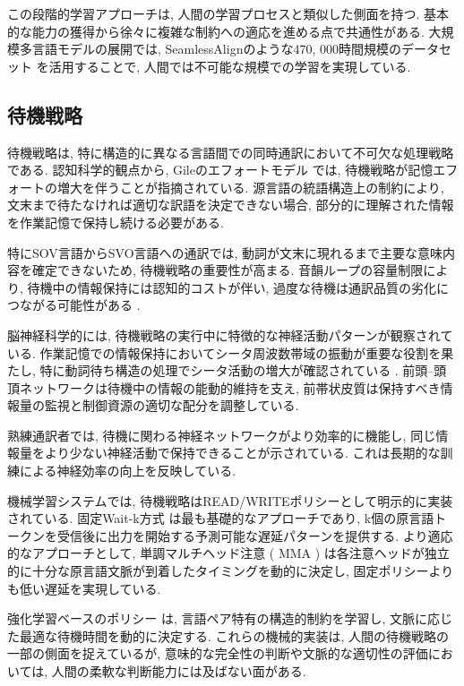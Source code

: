 この段階的学習アプローチは, 人間の学習プロセスと類似した側面を持つ.
基本的な能力の獲得から徐々に複雑な制約への適応を進める点で共通性がある.
大規模多言語モデルの展開では, SeamlessAlignのような470, 000時間規模のデータセット \cite{barrault2023seamlessm4t} を活用することで, 人間では不可能な規模での学習を実現している.

\subsection{待機戦略}

待機戦略は, 特に構造的に異なる言語間での同時通訳において不可欠な処理戦略である.
認知科学的観点から, Gileのエフォートモデル \cite{gile1995basic} では, 待機戦略が記憶エフォートの増大を伴うことが指摘されている.
源言語の統語構造上の制約により, 文末まで待たなければ適切な訳語を決定できない場合, 部分的に理解された情報を作業記憶で保持し続ける必要がある.

特にSOV言語からSVO言語への通訳では, 動詞が文末に現れるまで主要な意味内容を確定できないため, 待機戦略の重要性が高まる.
音韻ループの容量制限により, 待機中の情報保持には認知的コストが伴い, 過度な待機は通訳品質の劣化につながる可能性がある \cite{baddeley2000episodic}.

脳神経科学的には, 待機戦略の実行中に特徴的な神経活動パターンが観察されている.
作業記憶での情報保持においてシータ周波数帯域の振動が重要な役割を果たし, 特に動詞待ち構造の処理でシータ活動の増大が確認されている \cite{elmer2016functional}.
前頭--頭頂ネットワークは待機中の情報の能動的維持を支え, 前帯状皮質は保持すべき情報量の監視と制御資源の適切な配分を調整している.

熟練通訳者では, 待機に関わる神経ネットワークがより効率的に機能し, 同じ情報量をより少ない神経活動で保持できることが示されている.
これは長期的な訓練による神経効率の向上を反映している.

機械学習システムでは, 待機戦略はREAD/WRITEポリシーとして明示的に実装されている.
固定Wait-k方式 \cite{ma2019stacl} は最も基礎的なアプローチであり, k個の原言語トークンを受信後に出力を開始する予測可能な遅延パターンを提供する.
より適応的なアプローチとして, 単調マルチヘッド注意 ( MMA ) \cite{ma2020monotonic} は各注意ヘッドが独立的に十分な原言語文脈が到着したタイミングを動的に決定し, 固定ポリシーよりも低い遅延を実現している.

強化学習ベースのポリシー \cite{gu2017learning} は, 言語ペア特有の構造的制約を学習し, 文脈に応じた最適な待機時間を動的に決定する.
これらの機械的実装は, 人間の待機戦略の一部の側面を捉えているが, 意味的な完全性の判断や文脈的な適切性の評価においては, 人間の柔軟な判断能力には及ばない面がある.


